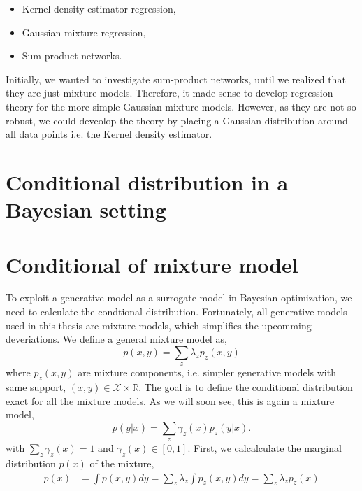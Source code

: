 \begin{itemize}[noitemsep]
     \item Kernel density estimator regression,
     \item Gaussian mixture regression,
     \item Sum-product networks.
 \end{itemize}

 \begin{note2}[]
    Initially, we wanted to investigate sum-product networks, until we realized that they are just
    mixture models. Therefore, it made sense to develop regression theory for the more simple
    Gaussian mixture models. However, as they are not so robust, we could deveolop the theory by
    placing a Gaussian distribution around all data points i.e. the Kernel density estimator. 
 \end{note2}



 \section{Conditional distribution in a Bayesian setting}\label{mixture_include_prior}
 




\section{Conditional of mixture model}\label{Conditional_mixture}
To exploit a generative model as a surrogate model in Bayesian optimization, we need to calculate
the condtional distribution. Fortunately, all generative models used in this thesis are mixture
models, which simplifies the upcomming deveriations. We define a general mixture model as, 
$$p(x,y) = \sum_z \lambda_z p_z(x,y)$$ where $p_z(x,y)$ are mixture components, i.e. simpler
generative models with same support, $(x,y) \in \mathcal{X}\times \mathbb{R}$. The goal is to define
the conditional distribution exact for all the mixture models. As we will soon see, this is again a
mixture model, 
$$p(y|x) = \sum_z \gamma_z(x) p_z(y|x).$$ with $\sum_z \gamma_z(x) = 1$ and $\gamma_z(x) \in [0,1]$.
First, we calcalculate the marginal distribution $p(x)$ of the mixture, 
\begin{align*}
    p(x) &= \int p(x,y) dy =\sum_{z} \lambda_z \int p_z(x,y) dy =\sum_{z} \lambda_z p_z(x)
\end{align*}

